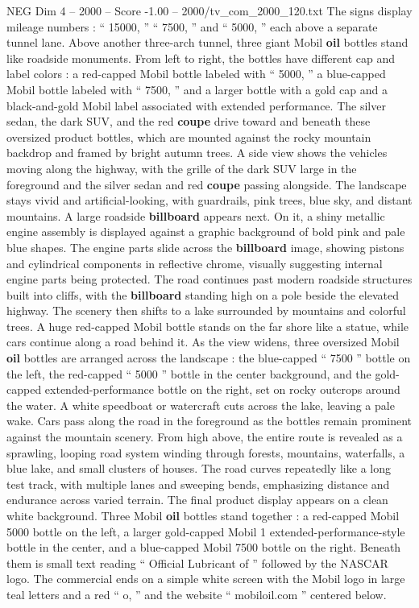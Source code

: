 \begin{textsample}{NEG Dim 4 – 2000 – Score -1.00 – 2000/tv\_com\_2000\_120.txt}
The signs display mileage numbers : “ 15000, ” “ 7500, ” and “ 5000, ” each above a separate tunnel lane.
Above another three-arch tunnel, three giant Mobil \textbf{oil} bottles stand like roadside monuments.
From left to right, the bottles have different cap and label colors : a red-capped Mobil bottle labeled with “ 5000, ” a blue-capped Mobil bottle labeled with “ 7500, ” and a larger bottle with a gold cap and a black-and-gold Mobil label associated with extended performance.
The silver sedan, the dark SUV, and the red \textbf{coupe} drive toward and beneath these oversized product bottles, which are mounted against the rocky mountain backdrop and framed by bright autumn trees.
A side view shows the vehicles moving along the highway, with the grille of the dark SUV large in the foreground and the silver sedan and red \textbf{coupe} passing alongside.
The landscape stays vivid and artificial-looking, with guardrails, pink trees, blue sky, and distant mountains.
A large roadside \textbf{billboard} appears next.
On it, a shiny metallic engine assembly is displayed against a graphic background of bold pink and pale blue shapes.
The engine parts slide across the \textbf{billboard} image, showing pistons and cylindrical components in reflective chrome, visually suggesting internal engine parts being protected.
The road continues past modern roadside structures built into cliffs, with the \textbf{billboard} standing high on a pole beside the elevated highway.
The scenery then shifts to a lake surrounded by mountains and colorful trees.
A huge red-capped Mobil bottle stands on the far shore like a statue, while cars continue along a road behind it.
As the view widens, three oversized Mobil \textbf{oil} bottles are arranged across the landscape : the blue-capped “ 7500 ” bottle on the left, the red-capped “ 5000 ” bottle in the center background, and the gold-capped extended-performance bottle on the right, set on rocky outcrops around the water.
A white speedboat or watercraft cuts across the lake, leaving a pale wake.
Cars pass along the road in the foreground as the bottles remain prominent against the mountain scenery.
From high above, the entire route is revealed as a sprawling, looping road system winding through forests, mountains, waterfalls, a blue lake, and small clusters of houses.
The road curves repeatedly like a long test track, with multiple lanes and sweeping bends, emphasizing distance and endurance across varied terrain.
The final product display appears on a clean white background.
Three Mobil \textbf{oil} bottles stand together : a red-capped Mobil 5000 bottle on the left, a larger gold-capped Mobil 1 extended-performance-style bottle in the center, and a blue-capped Mobil 7500 bottle on the right.
Beneath them is small text reading “ Official Lubricant of ” followed by the NASCAR logo.
The commercial ends on a simple white screen with the Mobil logo in large teal letters and a red “ o, ” and the website “ mobiloil.com ” centered below.

\end{textsample}
